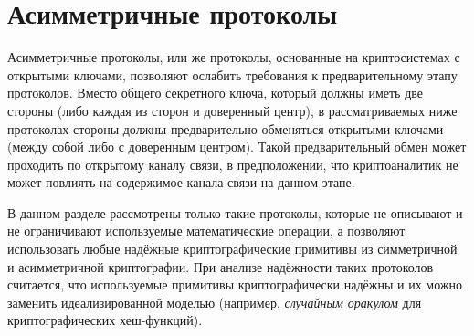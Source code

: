\section{Асимметричные протоколы}\label{section-protocols-asymmetric}

Асимметричные протоколы, или же протоколы, основанные на криптосистемах с открытыми ключами, позволяют ослабить требования к предварительному этапу протоколов. Вместо общего секретного ключа, который должны иметь две стороны (либо каждая из сторон и доверенный центр), в рассматриваемых ниже протоколах стороны должны предварительно обменяться открытыми ключами (между собой либо с доверенным центром). Такой предварительный обмен может проходить по открытому каналу связи, в предположении, что криптоаналитик не может повлиять на содержимое канала связи на данном этапе.

В данном разделе рассмотрены только такие протоколы, которые не описывают и не ограничивают используемые математические операции, а позволяют использовать любые надёжные криптографические примитивы из симметричной и асимметричной криптографии. При анализе надёжности таких протоколов считается, что используемые примитивы криптографически надёжны и их можно заменить идеализированной моделью (например, \emph{случайным оракулом} для криптографических хеш-функций).






